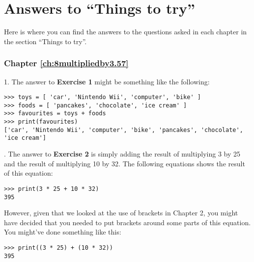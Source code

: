 

\chapter{Answers to ``Things to try''}\label{app:answers}

Here is where you can find the answers to the questions asked in each chapter in the section ``Things to try''.

\subsection*{Chapter \ref{ch:8multipliedby3.57}}

1. The answer to \textbf{Exercise 1} might be something like the following:

\begin{listing}
\begin{verbatim}
>>> toys = [ 'car', 'Nintendo Wii', 'computer', 'bike' ]
>>> foods = [ 'pancakes', 'chocolate', 'ice cream' ]
>>> favourites = toys + foods
>>> print(favourites)
['car', 'Nintendo Wii', 'computer', 'bike', 'pancakes', 'chocolate', 'ice cream']
\end{verbatim}
\end{listing}

.  The answer to \textbf{Exercise 2} is simply adding the result of multiplying 3 by 25 and the result of multiplying 10 by 32.  The following equations shows the result of this equation:

\begin{listing}
\begin{verbatim}
>>> print(3 * 25 + 10 * 32)
395
\end{verbatim}
\end{listing}

\noindent
However, given that we looked at the use of brackets in Chapter 2, you might have decided that you needed to put brackets around some parts of this equation.  You might've done something like this:

\begin{listing}
\begin{verbatim}
>>> print((3 * 25) + (10 * 32))
395
\end{verbatim}
\end{listing}

